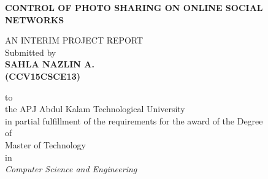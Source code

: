 \begin{titlepage}
\thispagestyle{empty}
         
		\begin{center}
        \vspace*{.2cm}
		   \textbf{\fontsize{16}{12}\selectfont CONTROL OF PHOTO SHARING ON ONLINE SOCIAL NETWORKS}
		\end{center}

		\vspace*{0.5cm}

		\begin{center}
				\MakeUppercase{An Interim Project Report}\\
		      	Submitted by\\
		 \vspace{0.5cm}
				\textbf{\fontsize{14}{12}\selectfont SAHLA NAZLIN A.}\\
                 \textbf{\fontsize{12}{12}\selectfont (CCV15CSCE13)}%
		\end{center}

    \vspace{0.5cm}

		\begin{center}
		to\\
		the APJ Abdul Kalam Technological University\\
in partial fulfillment of the requirements for the award of the Degree\\
of\\
Master of Technology\\
 in\\
 \textit{Computer Science and Engineering}\\
		
		\end{center}


\end{titlepage}
